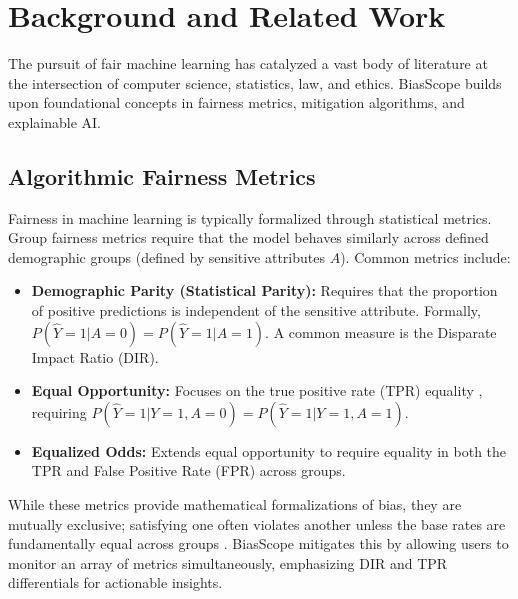 \documentclass[conference]{IEEEtran}
\begin{document}
\section{Background and Related Work} \label{sec:related_work}

The pursuit of fair machine learning has catalyzed a vast body of literature at the intersection of computer science, statistics, law, and ethics. BiasScope builds upon foundational concepts in fairness metrics, mitigation algorithms, and explainable AI.

\subsection{Algorithmic Fairness Metrics}
Fairness in machine learning is typically formalized through statistical metrics. Group fairness metrics require that the model behaves similarly across defined demographic groups (defined by sensitive attributes $A$). Common metrics include:
\begin{itemize}
    \item \textbf{Demographic Parity (Statistical Parity):} Requires that the proportion of positive predictions is independent of the sensitive attribute. Formally, $P(\hat{Y}=1 | A=0) = P(\hat{Y}=1 | A=1)$. A common measure is the Disparate Impact Ratio (DIR).
    \item \textbf{Equal Opportunity:} Focuses on the true positive rate (TPR) equality \cite{hardt2016equality}, requiring $P(\hat{Y}=1 | Y=1, A=0) = P(\hat{Y}=1 | Y=1, A=1)$.
    \item \textbf{Equalized Odds:} Extends equal opportunity to require equality in both the TPR and False Positive Rate (FPR) across groups.
\end{itemize}
While these metrics provide mathematical formalizations of bias, they are mutually exclusive; satisfying one often violates another unless the base rates are fundamentally equal across groups \cite{kleinberg2016inherent, chouldechova2017fair}. BiasScope mitigates this by allowing users to monitor an array of metrics simultaneously, emphasizing DIR and TPR differentials for actionable insights.
\end{document}
